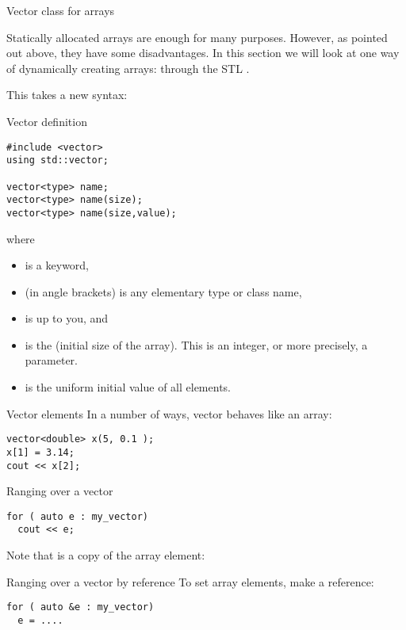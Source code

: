  {Vector class for arrays}
\label{sec:stdvector}

Statically allocated arrays are enough for many purposes. However, as
pointed out above, they have some disadvantages. In this section we
will look at one way of dynamically creating arrays: through the STL
.

This takes a new syntax:

\begin{block}{Vector definition}
  \label{sl:vector-def}
\begin{verbatim}
#include <vector>
using std::vector;

vector<type> name;
vector<type> name(size);
vector<type> name(size,value);
\end{verbatim}
where
\begin{itemize}
\item {} is a keyword,
\item {} (in angle brackets) is any elementary type or class
  name,
\item {} is up to you, and
\item {} is the (initial size of the array). This is an integer,
  or more precisely, a  parameter.
\item {} is the uniform initial value of all elements.
\end{itemize}
\end{block}

\begin{block}{Vector elements}
  \label{sl:vectorsub}
  In a number of ways, vector behaves like an array:
\begin{verbatim}
vector<double> x(5, 0.1 );
x[1] = 3.14;
cout << x[2];
\end{verbatim}
\end{block}

\begin{block}{Ranging over a vector}
  \label{sl:vector-range}
\begin{verbatim}
for ( auto e : my_vector)
  cout << e;
\end{verbatim}
Note that  is a copy of the array element:
\end{block}

\begin{block}{Ranging over a vector by reference}
  \label{sl:vector-range-ref}
To set array elements, make  a reference:
\begin{verbatim}
for ( auto &e : my_vector)
  e = ....
\end{verbatim}
\end{block}

